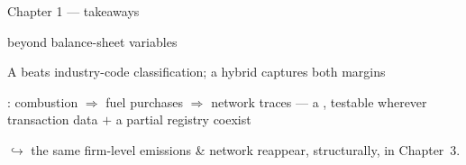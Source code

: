 \begin{frame}{Chapter 1 --- takeaways}

    \begin{wideitemize}
        \item {} beyond balance-sheet variables

        \item A  beats industry-code classification; a hybrid captures both margins

        \item {}: combustion $\Rightarrow$ fuel purchases $\Rightarrow$ network traces --- a , testable wherever transaction data $+$ a partial registry coexist

        \item[] {\color{dgray}\small $\hookrightarrow$ the same firm-level emissions \& network reappear, structurally, in Chapter~3.}
    \end{wideitemize}

\end{frame}
